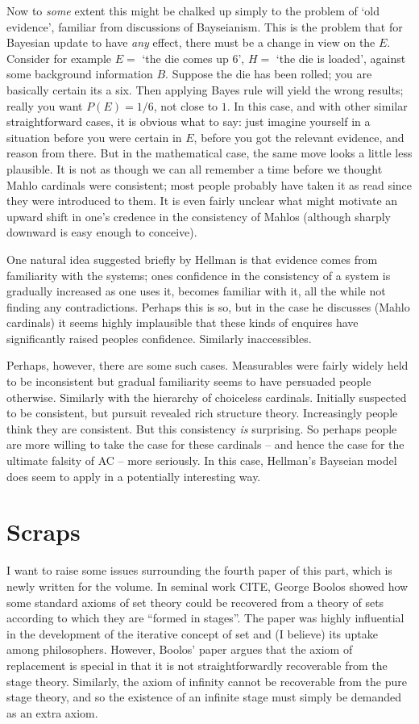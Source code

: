 \documentclass{asl}
\theoremstyle{definition}
\begin{document}
Now to \emph{some} extent this might be chalked up simply to the problem of 
`old evidence', familiar from discussions of Bayseianism. This is the 
problem that for Bayesian update to have \emph{any} effect, there must be a 
change in view on the $E$. Consider for example $E =$ `the die comes up 6', 
$H =$ `the die is loaded', against some background information $B$. Suppose 
the die has been rolled; you are basically certain its a six. Then applying 
Bayes rule will yield the wrong results; really you want $P(E) = 1/6$, 
not close to $1$. In this case, and with other similar straightforward cases, 
it is obvious what to say: just imagine yourself in a situation before you were 
certain in $E$, before you got the relevant evidence, and reason from there. 
But in the mathematical case, the same move looks a little less plausible. It 
is not as though we can all remember a time before we thought Mahlo cardinals 
were consistent; most people probably have taken it as read since they were 
introduced to them. It is even fairly unclear what might motivate an upward shift 
in one's credence in the consistency of Mahlos (although sharply downward is 
easy enough to conceive).

One natural idea suggested briefly by Hellman is that evidence comes from 
familiarity with the systems; ones confidence in the consistency of a system 
is gradually increased as one uses it, becomes familiar with it, all the while 
not finding any contradictions. Perhaps this is so, but in the case he discusses 
(Mahlo cardinals) it seems highly implausible that these kinds of enquires have 
significantly raised peoples confidence. Similarly inaccessibles.

Perhaps, however, there are some such cases. 
Measurables were fairly widely held to be inconsistent but gradual 
familiarity seems to have persuaded people otherwise. Similarly with the 
hierarchy of choiceless cardinals. Initially suspected to be consistent, 
but pursuit revealed rich structure theory. Increasingly people think they 
are consistent. But this consistency \emph{is} surprising. So perhaps people 
are more willing to take the case for these cardinals -- and hence the case 
for the ultimate falsity of AC -- more seriously. In this case, Hellman's 
Bayseian model does seem to apply in a potentially interesting way.

\section{Scraps}
I want to raise some issues surrounding 
the fourth paper of this part, 
which is newly written for the volume. 
In seminal work CITE, George Boolos showed 
how some standard axioms of set theory could 
be recovered from a theory of sets according 
to which they are ``formed in stages''. 
The paper was highly influential in the 
development of the iterative concept of 
set and (I believe) its uptake among philosophers. 
However, Boolos' paper argues that the axiom of 
replacement is special in that it is not 
straightforwardly recoverable from the stage theory. 
Similarly, the axiom of infinity cannot be recoverable 
from the pure stage theory, 
and so the existence of an infinite stage must 
simply be demanded as an extra axiom. 
\end{document}
